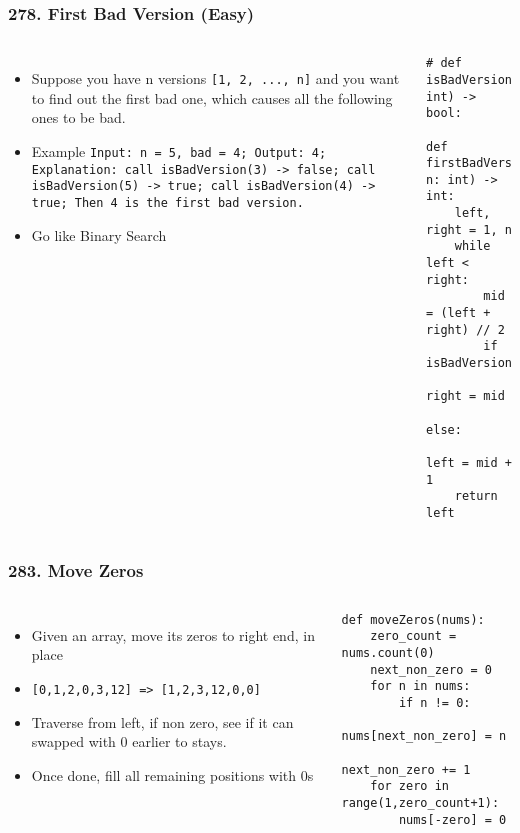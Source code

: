 \begin{frame}[fragile]\frametitle{278. First Bad Version (Easy)}

	\begin{columns}[T]
	\begin{itemize}
	\item Suppose you have n versions \lstinline|[1, 2, ..., n]| and you want to find out the first bad one, which causes all the following ones to be bad.
	\item Example 
	\lstinline|Input: n = 5, bad = 4; Output: 4; Explanation: call isBadVersion(3) -> false; call isBadVersion(5) -> true; call isBadVersion(4) -> true; Then 4 is the first bad version.|
	\item Go like Binary Search
	\end{itemize}
		\begin{lstlisting}[basicstyle=\scriptsize]
# def isBadVersion(version: int) -> bool:

def firstBadVersion(self, n: int) -> int:
    left, right = 1, n
    while left < right:
        mid = (left + right) // 2
        if isBadVersion(mid):
            right = mid
        else:
            left = mid + 1
    return left
		\end{lstlisting}		
	\end{columns}
	
	
\end{frame}


\begin{frame}[fragile]\frametitle{283. Move Zeros}

	\begin{columns}[T]
	\begin{itemize}
	\item Given an array, move its zeros to right end, in place
	\item \lstinline{[0,1,2,0,3,12] => [1,2,3,12,0,0]}
	\item Traverse from left, if non zero, see if it can swapped with 0 earlier to stays.
	\item Once done, fill all remaining positions with 0s
	\end{itemize}
		\begin{lstlisting}[basicstyle=\scriptsize]
def moveZeros(nums):
    zero_count = nums.count(0)
    next_non_zero = 0
    for n in nums:
        if n != 0:
            nums[next_non_zero] = n
            next_non_zero += 1
    for zero in range(1,zero_count+1):
        nums[-zero] = 0
				\end{lstlisting}		

	\end{columns}
		
\end{frame}


